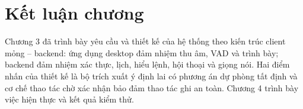 \section{Kết luận chương}
Chương 3 đã trình bày yêu cầu và thiết kế của hệ thống theo kiến trúc client mỏng – backend: ứng dụng desktop đảm nhiệm thu âm, VAD và trình bày; backend đảm nhiệm xác thực, lịch, hiểu lệnh, hội thoại và giọng nói. Hai điểm nhấn của thiết kế là bộ trích xuất ý định lai có phương án dự phòng tất định và cơ chế thao tác chờ xác nhận bảo đảm thao tác ghi an toàn. Chương 4 trình bày việc hiện thực và kết quả kiểm thử.
